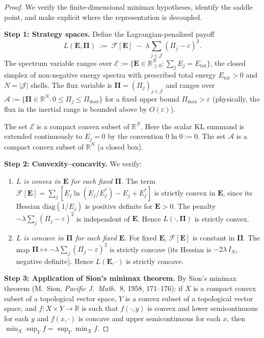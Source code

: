 \documentclass[12pt,a4paper]{article}
\theoremstyle{definition}
\theoremstyle{plain}
\theoremstyle{remark}
\begin{document}
\begin{proof}
We verify the finite-dimensional minimax hypotheses, identify the saddle
point, and make explicit where the representation is decoupled.

\smallskip\noindent
\textbf{Step 1: Strategy spaces.}\;
Define the Lagrangian-penalized payoff
\[
  L(\mathbf{E}, \boldsymbol{\Pi})
  \;:=\;
  \mathcal{F}[\mathbf{E}]
  \;-\;
  \lambda \sum_{j \in \mathcal{J}} (\Pi_j - \varepsilon)^2.
\]
The spectrum variable ranges over
$\mathcal{E} := \{\mathbf{E} \in \mathbb{R}^N_{\ge 0} :
\sum_j E_j = E_{\mathrm{tot}}\}$, the closed simplex of non-negative energy
spectra with prescribed total energy $E_{\mathrm{tot}} > 0$ and
  $N = |\mathcal{J}|$ shells.  The flux variable is
  $\boldsymbol{\Pi} = (\Pi_j)_{j\in\mathcal{J}}$ and ranges over
$\mathcal{A} := \{\boldsymbol{\Pi} \in \mathbb{R}^{N} :
0 \le \Pi_j \le \Pi_{\max}\}$ for a fixed upper bound
$\Pi_{\max} > \varepsilon$ (physically, the flux in the inertial range
is bounded above by $O(\varepsilon)$).

The set $\mathcal{E}$ is a compact convex subset of $\mathbb{R}^N$.
Here the scalar KL summand is extended continuously to $E_j=0$ by the
convention $0\ln 0:=0$.  The set $\mathcal{A}$ is a compact convex
subset of $\mathbb{R}^{N}$ (a closed box).

\smallskip\noindent
\textbf{Step 2: Convexity--concavity.}\;
We verify:
\begin{enumerate}[label=(\alph*)]
  \item \emph{$L$ is convex in $\mathbf{E}$ for each fixed
    $\boldsymbol{\Pi}$.}\;
    The term $\mathcal{F}[\mathbf{E}] = \sum_j [E_j\ln(E_j/E_j^*)
    - E_j + E_j^*]$ is strictly convex in $\mathbf{E}$, since its
    Hessian $\mathrm{diag}(1/E_j)$ is positive definite for
    $\mathbf{E} > 0$.  The penalty
    $-\lambda\sum_j(\Pi_j - \varepsilon)^2$ is independent
    of $\mathbf{E}$.  Hence $L(\cdot, \boldsymbol{\Pi})$ is
    strictly convex.
  \item \emph{$L$ is concave in $\boldsymbol{\Pi}$ for each fixed
    $\mathbf{E}$.}\;
    For fixed $\mathbf{E}$, $\mathcal{F}[\mathbf{E}]$ is constant
    in $\boldsymbol{\Pi}$.  The map $\boldsymbol{\Pi} \mapsto
    -\lambda\sum_j(\Pi_j - \varepsilon)^2$ is strictly concave
    (its Hessian is $-2\lambda\,I_{N}$, negative definite).
    Hence $L(\mathbf{E}, \cdot)$ is strictly concave.
\end{enumerate}

\smallskip\noindent
\textbf{Step 3: Application of Sion's minimax theorem.}\;
By Sion's minimax theorem (M.~Sion, \emph{Pacific J.\ Math.}\ 8,
1958, 171--176): if $X$ is a compact convex subset of a topological
vector space, $Y$ is a convex subset of a topological vector space,
and $f: X \times Y \to \mathbb{R}$ is such that $f(\cdot, y)$ is
convex and lower semicontinuous for each $y$ and $f(x, \cdot)$ is
concave and upper semicontinuous for each $x$, then
$\min_X \sup_Y f = \sup_Y \min_X f$.


\end{proof}
\end{document}
